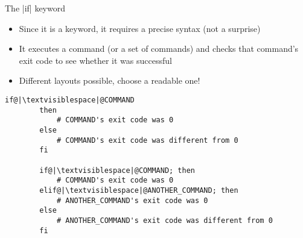 \begin{frame}[fragile]{The \bash|if| keyword}
    \vspace{-3mm}
    \begin{itemize}
        \item Since it is a keyword, it requires a precise syntax (not a surprise)
        \item It executes a command (or a set of commands) and checks that command's exit code to see whether it was successful
        \item Different layouts possible, choose a readable one!
    \end{itemize}
    
    \begin{lstlisting}[style=MyBash, numbers=none]
        if@|\textvisiblespace|@COMMAND
        then
            # COMMAND's exit code was 0
        else
            # COMMAND's exit code was different from 0
        fi
        
        if@|\textvisiblespace|@COMMAND; then
            # COMMAND's exit code was 0
        elif@|\textvisiblespace|@ANOTHER_COMMAND; then
            # ANOTHER_COMMAND's exit code was 0
        else
            # ANOTHER_COMMAND's exit code was different from 0
        fi
    \end{lstlisting}
\end{frame}

